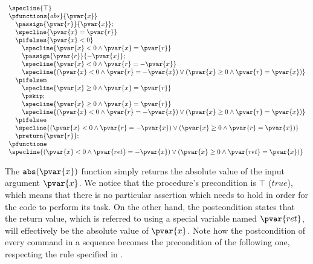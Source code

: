 \begin{center}
	\begin{gather*}
		\begin{array}{l}
		\specline{\top} \\
		\pfunctions{abs}{\pvar{x}} \\
			\quad \passign{\pvar{r}}{\pvar{x}}; \\
			\quad \specline{\pvar{x} = \pvar{r}} \\
			\quad \pifelses{\pvar{x} < 0} \\
				\quad \quad \specline{\pvar{x} < 0 \land \pvar{x} = \pvar{r}} \\
				\quad \quad \passign{\pvar{r}}{-\pvar{x}}; \\
				\quad \quad \specline{\pvar{x} < 0 \land \pvar{r} = - \pvar{x}} \\
				\quad \quad \specline{(\pvar{x} < 0 \land \pvar{r} = -\pvar{x}) \lor (\pvar{x} \geq 0 \land \pvar{r} = \pvar{x})} \\
			\quad \pifelsem \\
				\quad \quad \specline{\pvar{x} \geq 0 \land \pvar{x} = \pvar{r}} \\
				\quad \quad \pskip; \\
				\quad \quad \specline{\pvar{x} \geq 0 \land \pvar{x} = \pvar{r}} \\
				\quad \quad \specline{(\pvar{x} < 0 \land \pvar{r} = -\pvar{x}) \lor (\pvar{x} \geq 0 \land \pvar{r} = \pvar{x})} \\
			\quad \pifelsee \\
			\quad \specline{(\pvar{x} < 0 \land \pvar{r} = -\pvar{x}) \lor (\pvar{x} \geq 0 \land \pvar{r} = \pvar{x})} \\
			\quad \preturn{\pvar{r}}; \\
		\pfunctione \\
		\specline{(\pvar{x} < 0 \land \pvar{ret} = -\pvar{x}) \lor (\pvar{x} \geq 0 \land \pvar{ret} = \pvar{x})} \\
		\end{array}
	\end{gather*}
	\label{fig:abshoare} 
\end{center}

The $\mathtt{abs}(\pvar{x})$ function simply returns the absolute value of the input argument $\pvar{x}$. We notice that the procedure's precondition is $\top$ ($true$), which means that there is no particular assertion which needs to hold in order for the code to perform its task. On the other hand, the postcondition states that the return value, which is referred to using a special variable named $\pvar{ret}$, will effectively be the absolute value of $\pvar{x}$. Note how the postcondition of every command in a sequence becomes the precondition of the following one, respecting the rule specified in \cite{hoare}.

